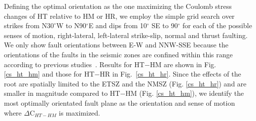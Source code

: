 \documentclass[draft,linenumbers]{agujournal2018}
\begin{document}
    
      Defining the optimal orientation as the one maximizing the Coulomb stress changes of HT relative to HM or HR, we employ the simple grid search over strikes from N$30^\circ$W to N90$^\circ$E and dips from 10$^\circ$ SE to 90$^\circ$
     for each of the possible senses of motion, right-lateral, left-lateral strike-slip, normal and thrust faulting. We only show fault orientations between E-W and NNW-SSE because the orientations of the faults in the seismic zones are confined within this range according to previous studies~\citep{shumway2008focal, hurd2012intraplate, johnson2014earthquake, cooley2015new}. Results for HT$-$HM are shown in Fig. \ref{cs_ht_hm} and those for HT$-$HR in Fig.~\ref{cs_ht_hr}. Since the effects of the root are spatially limited to the ETSZ and the NMSZ (Fig. \ref{cs_ht_hr}) and are smaller in magnitude compared to HT$-$HM (Fig. \ref{cs_ht_hm}), we identify the most optimally orientated fault plane as the orientation and sense of motion where $\Delta$C$_{HT-HM}$ is maximized.
\end{document}
